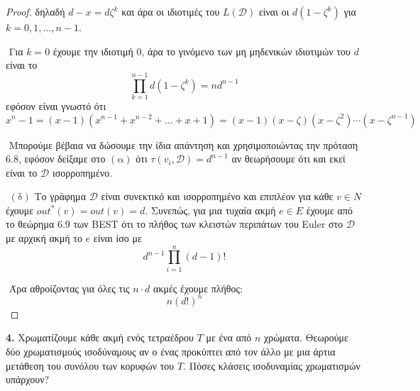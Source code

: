 \documentclass[oneside,a4paper]{article}
\newcommand {\tl}{\textlatin}
\begin{document}
\begin{proof}
δηλαδή $d-x = d\zeta^k$ και άρα οι ιδιοτιμές του $L(\mathcal{D})$ είναι οι $d(1-\zeta^k)$ για $k=0,1,\ldots,n-1$. 

$ $\newline
Για $k=0$ έχουμε την ιδιοτιμή $0$, άρα το γινόμενο των μη μηδενικών ιδιοτιμών του $d$ είναι το $$\prod\limits_{k=1}^{n-1} d (1-\zeta^k) = n d^{n-1} $$
εφόσον είναι γνωστό ότι $$x^n - 1 =  (x-1)(x^{n-1} + x^{n-2} + \ldots + x + 1) = (x-1)(x-\zeta)(x-\zeta^2)\cdots(x-\zeta^{n-1})$$

$ $\newline
Μπορούμε βέβαια να δώσουμε την ίδια απάντηση και χρησιμοποιώντας την πρόταση $6.8$, εφόσον δείξαμε στο $(\text{α})$ ότι $\tau (v_i, \mathcal{D})  = d^{n-1}$ αν θεωρήσουμε ότι και εκεί είναι το $\mathcal{D}$ ισορροπημένο.

$ $\newline
$(\text{δ})$ Το γράφημα $\mathcal{D}$ είναι συνεκτικό και ισορροπημένο και επιπλέον για κάθε $v \in N$ έχουμε $out^*(v) = out(v) = d$. Συνεπώς, για μια τυχαία ακμή $e \in E$ έχουμε από το θεώρημα $6.9$ των \tl{BEST} ότι το πλήθος των κλειστών περιπάτων του \tl{Euler} στο $\mathcal{D}$ με αρχική ακμή το $e$ είναι ίσο με
$$d^{n-1} \prod\limits_{i=1}^{n}(d-1)!$$

$ $\newline
Άρα αθροίζοντας για όλες τις $n\cdot d$ ακμές έχουμε πλήθος:
$$n (d!)^n$$
\end{proof}

\pagebreak




\noindent \textbf{4.} Χρωματίζουμε κάθε ακμή ενός τετραέδρου $T$ με ένα από $n$ χρώματα. Θεωρούμε δύο χρωματισμούς ισοδύναμους αν ο ένας προκύπτει από τον άλλο με μια άρτια μετάθεση του συνόλου των κορυφών του $T$. Πόσες κλάσεις ισοδυναμίας χρωματισμών υπάρχουν?
\end{document}
